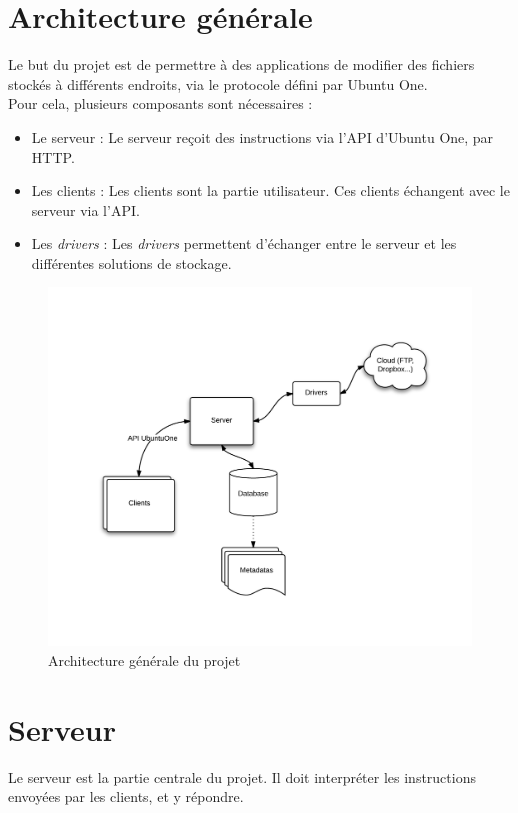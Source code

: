 \section{Architecture générale}
Le but du projet est de permettre à des applications de modifier des fichiers stockés à différents endroits, via le protocole défini par Ubuntu One.\\

Pour cela, plusieurs composants sont nécessaires :
\begin{itemize}
\renewcommand{\labelitemi}{$\bullet$}
   \item Le serveur : Le serveur reçoit des instructions via l'API d'Ubuntu One, par HTTP.
   \item Les clients : Les clients sont la partie utilisateur. Ces clients échangent avec le serveur via l'API.
   \item Les \textit{drivers} : Les \textit{drivers} permettent d'échanger entre le serveur et les différentes solutions de stockage.
\end{itemize}

\begin{figure}
    \center
    \includegraphics[width=500pt]{architecture.png}
    \caption{Architecture générale du projet}
\end{figure}

\section{Serveur}
Le serveur est la partie centrale du projet. Il doit interpréter les instructions envoyées par les clients, et y répondre.\\

